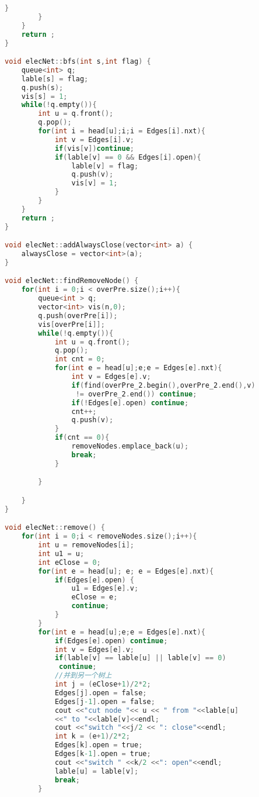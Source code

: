 \documentclass[withoutpreface,bwprint]{cumcmthesis} %
\begin{document}
\begin{appendices}
\begin{lstlisting}[language=C]
            }
        }
    }
    return ;
}

void elecNet::bfs(int s,int flag) {
    queue<int> q;
    lable[s] = flag;
    q.push(s);
    vis[s] = 1;
    while(!q.empty()){
        int u = q.front();
        q.pop();
        for(int i = head[u];i;i = Edges[i].nxt){
            int v = Edges[i].v;
            if(vis[v])continue;
            if(lable[v] == 0 && Edges[i].open){
                lable[v] = flag;
                q.push(v);
                vis[v] = 1;
            }
        }
    }
    return ;
}

void elecNet::addAlwaysClose(vector<int> a) {
    alwaysClose = vector<int>(a);
}

void elecNet::findRemoveNode() {
    for(int i = 0;i < overPre.size();i++){
        queue<int > q;
        vector<int> vis(n,0);
        q.push(overPre[i]);
        vis[overPre[i]];
        while(!q.empty()){
            int u = q.front();
            q.pop();
            int cnt = 0;
            for(int e = head[u];e;e = Edges[e].nxt){
                int v = Edges[e].v;
                if(find(overPre_2.begin(),overPre_2.end(),v)
                 != overPre_2.end()) continue;
                if(!Edges[e].open) continue;
                cnt++;
                q.push(v);
            }
            if(cnt == 0){
                removeNodes.emplace_back(u);
                break;
            }

        }

    }
}

void elecNet::remove() {
    for(int i = 0;i < removeNodes.size();i++){
        int u = removeNodes[i];
        int u1 = u;
        int eClose = 0;
        for(int e = head[u]; e; e = Edges[e].nxt){
            if(Edges[e].open) {
                u1 = Edges[e].v;
                eClose = e;
                continue;
            }
        }
        for(int e = head[u];e;e = Edges[e].nxt){
            if(Edges[e].open) continue;
            int v = Edges[e].v;
            if(lable[v] == lable[u] || lable[v] == 0)
             continue;
            //并到另一个树上
            int j = (eClose+1)/2*2;
            Edges[j].open = false;
            Edges[j-1].open = false;
            cout <<"cut node "<< u << " from "<<lable[u]
            <<" to "<<lable[v]<<endl;
            cout <<"switch "<<j/2 << ": close"<<endl;
            int k = (e+1)/2*2;
            Edges[k].open = true;
            Edges[k-1].open = true;
            cout <<"switch " <<k/2 <<": open"<<endl;
            lable[u] = lable[v];
            break;
        }


\end{lstlisting}
\end{appendices}
\end{document}
